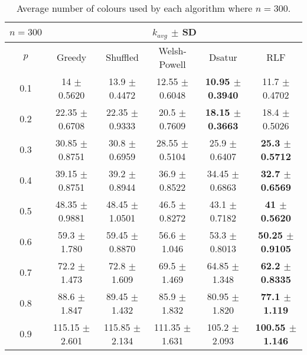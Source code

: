 \begin{table}[H]
    \centering
    \begin{tabular}{cccccc}
        
        $n = 300$& \multicolumn{5}{c}{$k_{avg}$ $\pm$ SD} \\
        \hline
        $p$ & Greedy & Shuffled & Welsh-Powell & Dsatur & RLF \\
        \hline
        0.1 & 14 $\pm$ 0.5620 & 13.9 $\pm$ 0.4472 & 12.55 $\pm$ 0.6048 & \textbf{10.95 $\pm$ 0.3940} & 11.7 $\pm$ 0.4702 \\
        0.2 & 22.35 $\pm$ 0.6708 & 22.35 $\pm$ 0.9333 & 20.5 $\pm$ 0.7609 & \textbf{18.15 $\pm$ 0.3663} & 18.4 $\pm$ 0.5026 \\
        0.3 & 30.85 $\pm$ 0.8751 & 30.8 $\pm$ 0.6959 & 28.55 $\pm$ 0.5104 & 25.9 $\pm$ 0.6407 & \textbf{25.3 $\pm$ 0.5712} \\
        0.4 & 39.15 $\pm$ 0.8751 & 39.2 $\pm$ 0.8944 & 36.9 $\pm$ 0.8522 & 34.45 $\pm$ 0.6863 & \textbf{32.7 $\pm$ 0.6569} \\
        0.5 & 48.35 $\pm$ 0.9881 & 48.45 $\pm$ 1.0501 & 46.5 $\pm$ 0.8272 & 43.1 $\pm$ 0.7182 & \textbf{41 $\pm$ 0.5620} \\
        0.6 & 59.3 $\pm$ 1.780 & 59.45 $\pm$ 0.8870 & 56.6 $\pm$ 1.046 & 53.3 $\pm$ 0.8013 & \textbf{50.25 $\pm$ 0.9105} \\
        0.7 & 72.2 $\pm$ 1.473 & 72.8 $\pm$ 1.609 & 69.5 $\pm$ 1.469 & 64.85 $\pm$ 1.348 & \textbf{62.2 $\pm$ 0.8335} \\
        0.8 & 88.6 $\pm$ 1.847 & 89.45 $\pm$ 1.432 & 85.9 $\pm$ 1.832 & 80.95 $\pm$ 1.820 & \textbf{77.1 $\pm$ 1.119} \\
        0.9 & 115.15 $\pm$ 2.601 & 115.85 $\pm$ 2.134 & 111.35 $\pm$ 1.631 & 105.2 $\pm$ 2.093 & \textbf{100.55 $\pm$ 1.146} \\
        \hline
    \end{tabular}
    \caption{Average number of colours used by each algorithm where $n = 300$.}
    \label{tab:avgKforV300}
\end{table}

